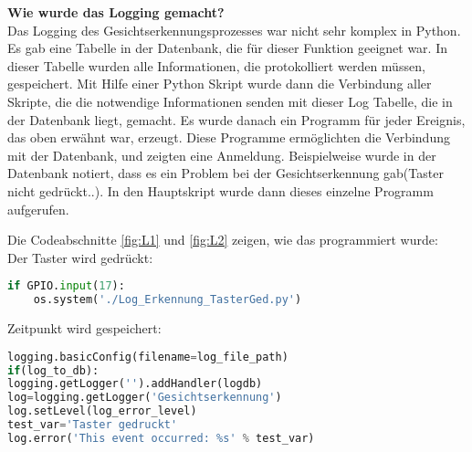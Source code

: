 \textbf{Wie wurde das Logging gemacht?}\\
Das Logging des Gesichtserkennungsprozesses war nicht sehr komplex in Python. Es gab eine Tabelle in der Datenbank, die für dieser Funktion geeignet war. In dieser Tabelle wurden alle Informationen, die protokolliert werden müssen, gespeichert. Mit Hilfe einer Python Skript wurde dann die Verbindung aller Skripte, die die notwendige Informationen senden mit dieser Log Tabelle, die in der Datenbank liegt, gemacht. Es wurde danach ein Programm für jeder Ereignis, das oben erwähnt war, erzeugt. Diese Programme ermöglichten die Verbindung mit der Datenbank, und zeigten eine Anmeldung. Beispielweise wurde in der Datenbank notiert, dass es ein Problem bei der Gesichtserkennung gab(Taster nicht gedrückt..). In den Hauptskript wurde dann dieses einzelne Programm aufgerufen.

Die Codeabschnitte \ref{fig:L1} und \ref{fig:L2} zeigen, wie das programmiert wurde:\\

Der Taster wird gedrückt: \\

\begin{lstlisting}[caption={Log f{\"u}r gedr{\"u}cktes Taster},label={fig:L1},language=Python]
	if GPIO.input(17):
	os.system('./Log_Erkennung_TasterGed.py')
\end{lstlisting}

Zeitpunkt wird gespeichert: \\

\begin{lstlisting}[caption={Log f{\"u}r den Zeitpunkt},label={fig:L2},language=Python]
logging.basicConfig(filename=log_file_path)
if(log_to_db):
logging.getLogger('').addHandler(logdb)
log=logging.getLogger('Gesichtserkennung')
log.setLevel(log_error_level)
test_var='Taster gedruckt'
log.error('This event occurred: %s' % test_var)
\end{lstlisting}

